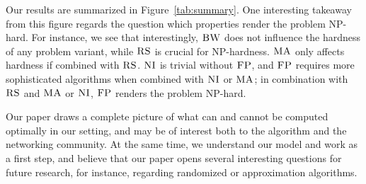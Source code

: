 \documentclass[9pt]{sigcomm-alternate}
\newcommand{\maciek}[1]{\textcolor{brown}{maciek: #1}}
\newcommand{\CC}{\textsc{NI}}
\newcommand{\FP}{\textsc{FP}}
\newcommand{\RS}{\textsc{RS}}
\newcommand{\BW}{\textsc{BW}}
\newcommand{\MA}{\textsc{MA}}
\begin{document}
Our results are summarized in
Figure~\ref{tab:summary}.
One interesting takeaway from this figure regards
the question which properties render the problem
NP-hard. For instance, we see that interestingly, $\BW$
does not influence the hardness of any problem variant,
while $\RS$ is crucial for NP-hardness.
$\MA$ only affects hardness if combined with $\RS$.
$\CC$ is trivial without $\FP$, and $\FP$ requires
more sophisticated algorithms when combined with $\CC$ or $\MA$;
in combination with $\RS$ and $\MA$ or $\CC$, $\FP$ renders the
problem NP-hard.





Our paper draws a complete picture of what can and cannot be
computed optimally in our setting, and may be of interest both to the algorithm
and the networking community. At the same time, we understand our model and work
as a first step, and believe that our paper opens several interesting
questions for future research, for instance, regarding randomized
or approximation algorithms.


%
{\footnotesize \renewcommand{\baselinestretch}{.9}


}
\end{document}

